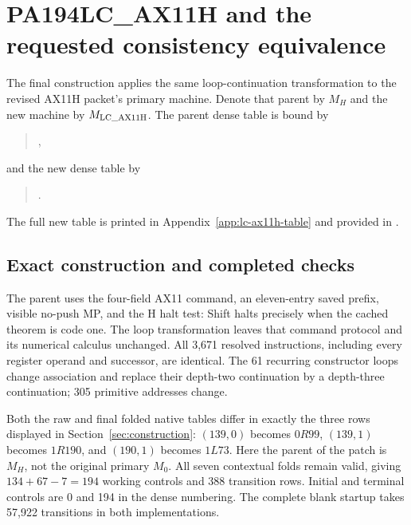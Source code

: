 \section{PA194LC\_AX11H and the requested consistency equivalence}
\label{sec:lc-ax11h}

The final construction applies the same loop-continuation transformation
to the revised AX11H packet's primary machine. Denote that parent by
$M_H$ and the new machine by $M_{\mathrm{LC\_AX11H}}$. The parent dense table is bound by
\begin{quote}\small
{},
\end{quote}
and the new dense table by
\begin{quote}\small
{}.
\end{quote}
The full new table is printed in Appendix~\ref{app:lc-ax11h-table} and
provided in .

\subsection{Exact construction and completed checks}

The parent uses the four-field AX11 command, an eleven-entry saved prefix,
visible no-push MP, and the H halt test: Shift halts precisely when the
cached theorem is code one. The loop transformation leaves that command
protocol and its numerical calculus unchanged. All 3,671 resolved
instructions, including every register operand and successor, are
identical. The 61 recurring constructor loops change association and
replace their depth-two continuation by a depth-three continuation;
305 primitive addresses change.

Both the raw and final folded native tables differ in exactly the three
rows displayed in Section~\ref{sec:construction}: $(139,0)$ becomes
$0R99$, $(139,1)$ becomes $1R190$, and $(190,1)$ becomes $1L73$.
Here the parent of the patch is $M_H$, not the original primary $M_0$.
All seven contextual folds remain valid, giving $134+67-7=194$ working
controls and 388 transition rows. Initial and terminal controls are 0
and 194 in the dense numbering. The complete blank startup takes 57,922
transitions in both implementations.


